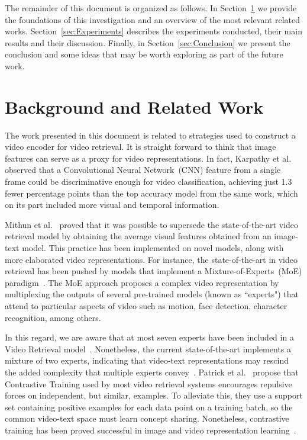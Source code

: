 \documentclass[a4paper,runningheads]{llncs}
\begin{document}
The remainder of this document is organized as follows. In Section~\ref{sec:Background} we provide the foundations of this investigation and an overview of the most relevant related works. Section~\ref{sec:Experiments} describes the experiments conducted, their main results and their discussion. Finally, in Section~\ref{sec:Conclusion} we present the conclusion and some ideas that may be worth exploring as part of the future work.



\section{Background and Related Work}
\label{sec:Background}

The work presented in this document is related to strategies used to construct a video encoder for video retrieval. It is straight forward to think that image features can serve as a proxy for video representations. In fact, Karpathy et al.~\cite{karpathy2014large} observed that a Convolutional Neural Network~(CNN) feature from a single frame could be discriminative enough for video classification, achieving just 1.3 fewer percentage points than the top accuracy model from the same work, which on its part included more visual and temporal information.

Mithun et al.~\cite{Mithun2018MultimodalCuesVSE} proved that it was possible to supersede the state-of-the-art video retrieval model by obtaining the average visual features obtained from an image-text model. This practice has been implemented on novel models, along with more elaborated video representations. For instance, the state-of-the-art in video retrieval has been pushed by models that implement a Mixture-of-Experts~(MoE) paradigm~\cite{Gabeur2020MMT,Liu2020CE,Miech18MoE,Patrick2021supportset}. The MoE approach proposes a complex video representation by multiplexing the outputs of several pre-trained models (known as ``experts") that attend to particular aspects of video such as motion, face detection, character recognition, among others. 

In this regard, we are aware that at most seven experts have been included in a Video Retrieval model~\cite{Gabeur2020MMT}. Nonetheless, the current state-of-the-art implements a mixture of two experts, indicating that video-text representations may rescind the added complexity that multiple experts convey~\cite{Patrick2021supportset}. Patrick et al.~\cite{Patrick2021supportset} propose that Contrastive Training used by most video retrieval systems encourages repulsive forces on independent, but similar, examples. To alleviate this, they use a support set containing positive examples for each data point on a training batch, so the common video-text space must learn concept sharing. Nonetheless, contrastive training has been proved successful in image and video representation learning~\cite{Chen2020SimCLR,Miech2020end}. 
\end{document}
